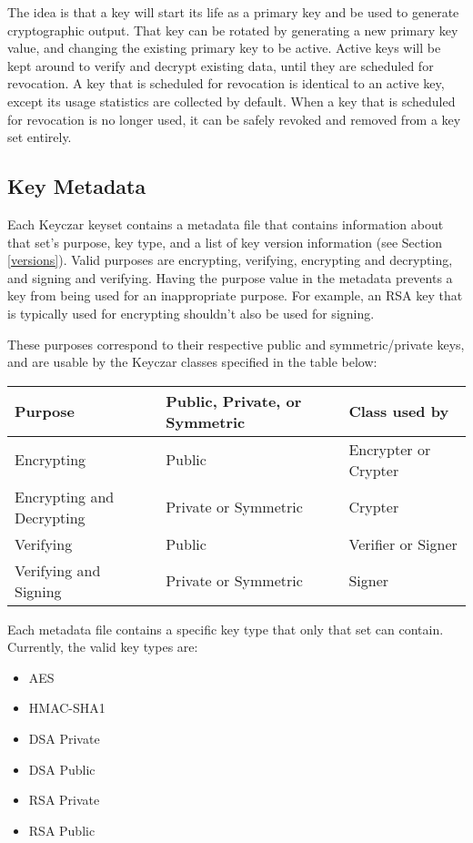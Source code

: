 \documentclass{llncs}
\begin{document}
The idea is that a key will start its life as a primary key and be used to
generate cryptographic output. That key can be rotated by generating a new
primary key value, and changing the existing primary key to be active. Active
keys will be kept around to verify and decrypt existing data, until they are
scheduled for revocation. A key that is scheduled for revocation is identical
to an active key, except its usage statistics are collected by default. When a
key that is scheduled for revocation is no longer used, it can be safely
revoked and removed from a key set entirely.

\subsection{Key Metadata}\label{metadata}

Each Keyczar keyset contains a metadata file that contains information about
that set's purpose, key type, and a list of key version information (see
Section \ref{versions}). Valid purposes are encrypting, verifying, encrypting
and decrypting, and signing and verifying. Having the purpose value in the
metadata prevents a key from being used for an inappropriate purpose. For
example, an RSA key that is typically used for encrypting shouldn't also be
used for signing.

These purposes correspond to their respective public and symmetric/private
keys, and are usable by the Keyczar classes specified in the table below: 

\begin{tabular}{ l | l | l }
{\bf Purpose} &  {\bf Public, Private, or Symmetric } & {\bf Class used by} \\
\hline Encrypting & Public & Encrypter or Crypter \\ \hline
Encrypting and Decrypting & Private or Symmetric & Crypter \\ \hline
Verifying & Public & Verifier or Signer \\ \hline 
Verifying and Signing & Private or Symmetric & Signer \\ \hline
\end{tabular}

Each metadata file contains a specific key type that only that set can contain.
Currently, the valid key types are:
\begin{itemize}
  \item AES
  \item HMAC-SHA1
  \item DSA Private
  \item DSA Public
  \item RSA Private
  \item RSA Public
\end{itemize}
\end{document}
